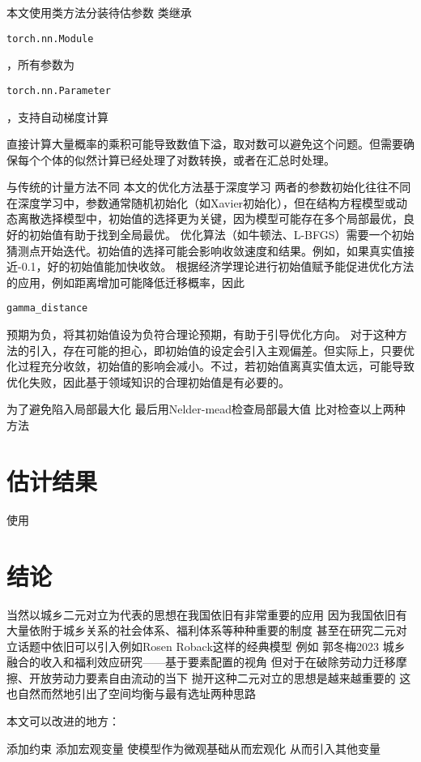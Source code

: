 \documentclass[10pt,a4paper]{article}
\begin{document}
本文使用类方法分装待估参数
类继承\begin{verbatim}torch.nn.Module\end{verbatim}，所有参数为\begin{verbatim}torch.nn.Parameter\end{verbatim}，支持自动梯度计算

直接计算大量概率的乘积可能导致数值下溢，取对数可以避免这个问题。但需要确保每个个体的似然计算已经处理了对数转换，或者在汇总时处理。

与传统的计量方法不同
本文的优化方法基于深度学习
两者的参数初始化往往不同
在深度学习中，参数通常随机初始化（如Xavier初始化），但在结构方程模型或动态离散选择模型中，初始值的选择更为关键，因为模型可能存在多个局部最优，良好的初始值有助于找到全局最优。
优化算法（如牛顿法、L-BFGS）需要一个初始猜测点开始迭代。初始值的选择可能会影响收敛速度和结果。例如，如果真实值接近-0.1，好的初始值能加快收敛。
根据经济学理论进行初始值赋予能促进优化方法的应用，例如距离增加可能降低迁移概率，因此\begin{verbatim}gamma_distance\end{verbatim}预期为负，将其初始值设为负符合理论预期，有助于引导优化方向。
对于这种方法的引入，存在可能的担心，即初始值的设定会引入主观偏差。但实际上，只要优化过程充分收敛，初始值的影响会减小。不过，若初始值离真实值太远，可能导致优化失败，因此基于领域知识的合理初始值是有必要的。


为了避免陷入局部最大化
最后用Nelder-mead检查局部最大值
比对检查以上两种方法

\section{估计结果}

使用




\section{结论}
当然以城乡二元对立为代表的思想在我国依旧有非常重要的应用 因为我国依旧有大量依附于城乡关系的社会体系、福利体系等种种重要的制度
甚至在研究二元对立话题中依旧可以引入例如Rosen Roback这样的经典模型
例如 郭冬梅2023 城乡融合的收入和福利效应研究——基于要素配置的视角
但对于在破除劳动力迁移摩擦、开放劳动力要素自由流动的当下
抛开这种二元对立的思想是越来越重要的
这也自然而然地引出了空间均衡与最有选址两种思路

本文可以改进的地方：

添加约束
添加宏观变量
使模型作为微观基础从而宏观化
从而引入其他变量
\end{document}
